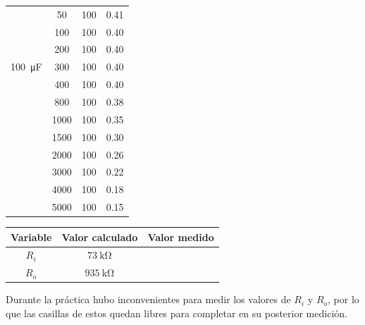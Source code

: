 \documentclass[a4paper,12pt]{article}
\newcommand{\mR}[1]{\SI{#1}{\kilo\ohm}}
\begin{document}
\begin{table}[h]
\begin{tabular}{|c|c|c|c|}
                                & 50   & 100 & 0.41 \\ \cline{2-4}
                                & 100  & 100 & 0.40  \\ \cline{2-4}
                                & 200  & 100 & 0.40  \\ \cline{2-4}
        \SI{100}{\micro F}      & 300  & 100 & 0.40  \\ \cline{2-4}
                                & 400  & 100 & 0.40   \\ \cline{2-4}
                                & 800  & 100 & 0.38  \\ \cline{2-4}
                                & 1000 & 100 & 0.35  \\ \cline{2-4}
                                & 1500 & 100 & 0.30  \\ \cline{2-4}
                                & 2000 & 100 & 0.26  \\ \cline{2-4}
                                & 3000 & 100 & 0.22  \\ \cline{2-4}
                                & 4000 & 100 & 0.18  \\ \cline{2-4}
                                & 5000 & 100 & 0.15  \\ \hline
    \end{tabular}
\end{table}
\begin{table}[h]
    \centering
    \begin{tabular}{|c|c|c|}
        \hline
        Variable    & Valor calculado   & Valor medido      \\ \hline
        $R_i$       & $\mR{73}$         &                   \\ \hline
        $R_o$       & $\mR{935}$        &                   \\ \hline
    \end{tabular}
\end{table}

Durante la práctica hubo inconvenientes para medir los valores de $R_i$ y $R_o$, por lo que las casillas de estos quedan libres
para completar en su posterior medición.


\newpage
\end{document}
